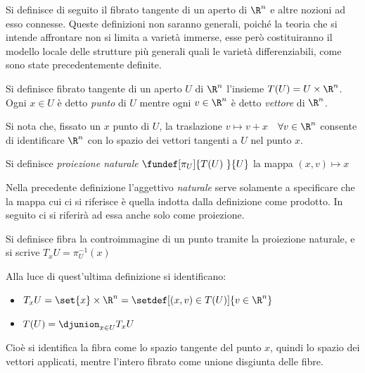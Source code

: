 

Si definisce di seguito il fibrato tangente di un aperto di $\R ^n$ e altre nozioni ad esso connesse.
Queste definizioni non saranno generali, poiché la teoria che si intende affrontare non si limita a varietà immerse, esse però costituiranno il modello locale delle strutture più generali quali le varietà differenziabili, come sono state precedentemente definite.

\begin{defn}
Si definisce fibrato tangente di un aperto $U$ di $\R ^n$ l'insieme $T(U) = U \times \R ^n$. Ogni $x\in U$ è detto \emph{punto} di $U$ mentre ogni $v\in \R ^n$ è detto \emph{vettore} di $\R ^n$.
\end{defn}

Si nota che, fissato un $x$ punto di $U$, la traslazione $v \mapsto v + x$~~$\forall v\in \R ^n$  consente di identificare $\R ^n$ con lo spazio dei vettori tangenti a $U$ nel punto $x$.


\begin{defn}
Si definisce \emph{proiezione naturale} $\fundef[\pi _U]{T(U)~}{U}$ la mappa $(x,v) \mapsto x$
\end{defn}

Nella precedente definizione l'aggettivo \emph{naturale} serve solamente a specificare che la mappa cui ci si riferisce è quella indotta dalla definizione come prodotto. In seguito ci si riferirà ad essa anche solo come proiezione.

\begin{defn}[Fibra]
Si definisce fibra la controimmagine di un punto tramite la proiezione naturale, e si scrive $T_x U = \pi ^{-1} _U (x)$
\end{defn}

Alla luce di quest'ultima definizione si identificano:
\begin{itemize}
\item $T_x U = \set{x} \times \R ^n = \setdef[(x,v)\in T(U)]{v \in \R^n}$
\item $T(U) = \djunion_{x \in U} T_x U$
\end{itemize}
Cioè si identifica la fibra come lo spazio tangente del punto $x$, quindi lo spazio dei vettori applicati, mentre l'intero fibrato come unione disgiunta delle fibre.


